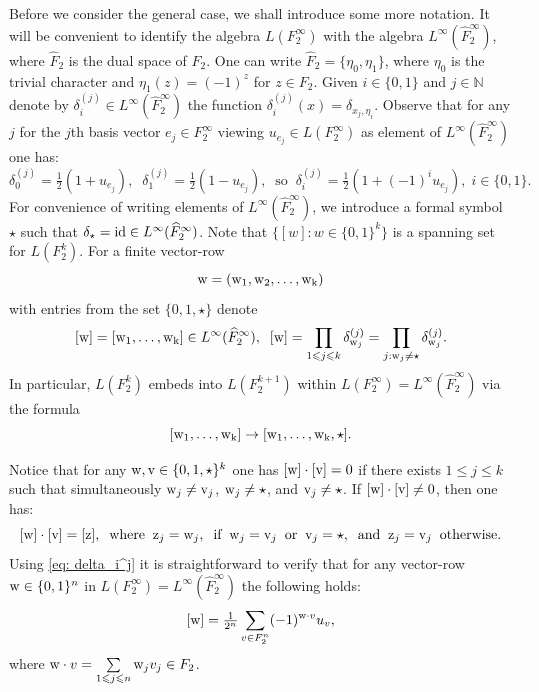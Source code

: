 \documentclass[11pt]{amsart}
\newcommand{\id}{{\rm id}}
\theoremstyle{plain}
\theoremstyle{definition}
\theoremstyle{remark}
\numberwithin{equation}{section}
\begin{document}
Before we consider the general case, we shall introduce some more notation. It will be convenient to identify the algebra $L( F_2^\infty)$ with the algebra $L^\infty(\widehat{ F}_2^\infty)$, where $\widehat{F}_2$ is the dual space of $F_2$. One can write $\widehat{F}_2=\{\eta_0,\eta_1\}$, where $\eta_0$ is the trivial character and $\eta_1(z)=(-1)^z$ for $z\in F_2$. Given $i\in\{0,1\}$ and $j\in\mathbb N$ denote by $\delta_i^{(j)}\in L^\infty(\widehat{ F}_2^\infty)$ the function $\delta_i^{(j)}(x)=\delta_{x_j,\eta_i}$. Observe that for any $j$ for the $j$th basis vector $e_j\in F_2^\infty$ viewing $u_{e_j}\in L(F_2^\infty)$ as element of $L^\infty(\widehat{F}_2^\infty)$ one has:
\begin{equation}\label{eq: delta_i^j}
	\delta_0^{(j)}=\tfrac{1}{2}(1+u_{e_j}),\;\; \delta_1^{(j)}=\tfrac{1}{2}(1-u_{e_j}),\;\;\text{so}\;\;\delta_i^{(j)}=\tfrac{1}{2}(1+(-1)^iu_{e_j}),\;i\in\{0,1\}.
\end{equation} For convenience of writing elements of $L^\infty(\widehat{F}_2^\infty)$, we introduce a formal symbol $\star$ such that $\delta_\star=\id\in L^\infty(\widehat{F}_2^\infty)$. 
Note that $\{[w]: w\in \{0,1\}^k\}$ is a spanning set for $L(F_2^k)$.
For a finite vector-row $${\rm w=(w_1,w_2,\ldots,w_k)}$$ with entries from the set $\{0,1,\star\}$ denote $${\rm [w]=[w_1,\ldots,w_k]}\in L^\infty(\widehat{ F}_2^\infty),\;\; [{\rm w}]=\prod\limits_{1\leqslant j\leqslant k} \delta_{{\rm w}_j}^{(j)}=\prod\limits_{j:{\rm w}_j\neq \star} \delta_{{\rm w}_j}^{(j)}.$$ In particular, $L(F_2^k)$ embeds into $L(F_2^{k+1})$ within $L(F_2^\infty)=L^\infty(\widehat{F}_2^\infty)$ via the formula $${\rm [w_1,\ldots,w_k]}\to {\rm [w_1,\ldots,w_k,\star]}.$$

Notice that for any ${\rm w,v}\in\{0,1,\star\}^k$ one has ${\rm [w]\cdot [v]}=0$ if there exists $1\leqslant j\leqslant k$ such that simultaneously ${\rm w}_j\neq {\rm v}_j$, ${\rm w}_j\neq\star$, and ${\rm v}_j\neq\star$. If ${\rm [w]\cdot[v]}\neq 0$, then one has:
\begin{equation}\label{eq:[w]*[u]}
	{\rm [w]\cdot [v]=[z]},\;\;\text{where}\;\;{\rm z}_j={\rm w}_j,\;\;\text{if}\;\;{\rm w}_j={\rm v}_j\;\;\text{or}\;\;{\rm v}_j=\star,\;\;\text{and}\;\;{\rm z}_j={\rm v}_j\;\;\text{otherwise}.
\end{equation}
Using \eqref{eq: delta_i^j} it is straightforward to verify that for any vector-row ${\rm w}\in\{0,1\}^n$ in $L( F_2^\infty)=L^\infty(\widehat{ F}_2^\infty)$ the following holds:
\begin{equation}\label{eq: [w] expansion}
	[{\rm w}]=\tfrac{1}{2^n}\sum\limits_{v\in F_2^n}(-1)^{{\rm w}\cdot v}u_v,
\end{equation} where ${\rm w}\cdot v=\sum\limits_{1\leqslant j\leqslant n}{\rm w}_jv_j\in F_2$.
\end{document}
